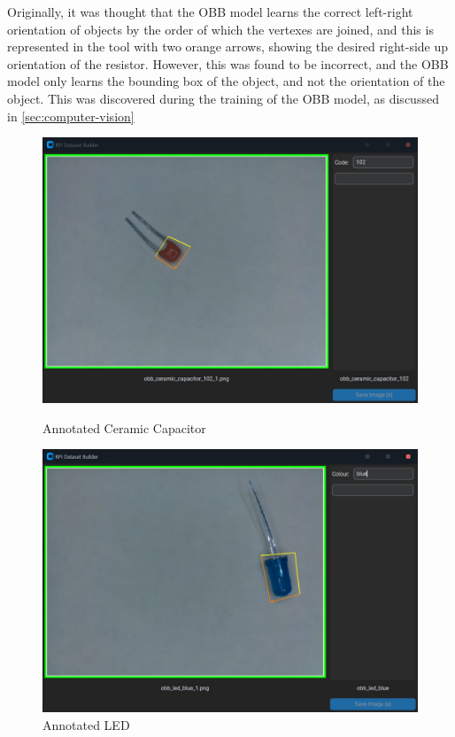 Originally, it was thought that the OBB model learns the correct left-right orientation of objects by the order of which the vertexes are joined, and this is represented in the tool with two orange arrows, showing the desired right-side up orientation of the resistor. However, this was found to be incorrect, and the OBB model only learns the bounding box of the object, and not the orientation of the object. This was discovered during the training of the OBB model, as discussed in \autoref{sec:computer-vision}

\begin{figure}[H]
    \hfill
    \begin{minipage}[t]{0.45\textwidth}
      \centering
      \includegraphics[width=\columnwidth]{imgs/python/capcapture.jpg}
      \caption{Annotated Ceramic Capacitor}
      \label{fig:capcapture}
    \end{minipage}
    \hfill
    \begin{minipage}[t]{0.45\textwidth}
      \centering
      \includegraphics[width=\columnwidth]{imgs/python/ledcapture.jpg}
      \caption{Annotated LED}
      \label{fig:indcapture}
    \end{minipage}
    \hfill
\end{figure}

